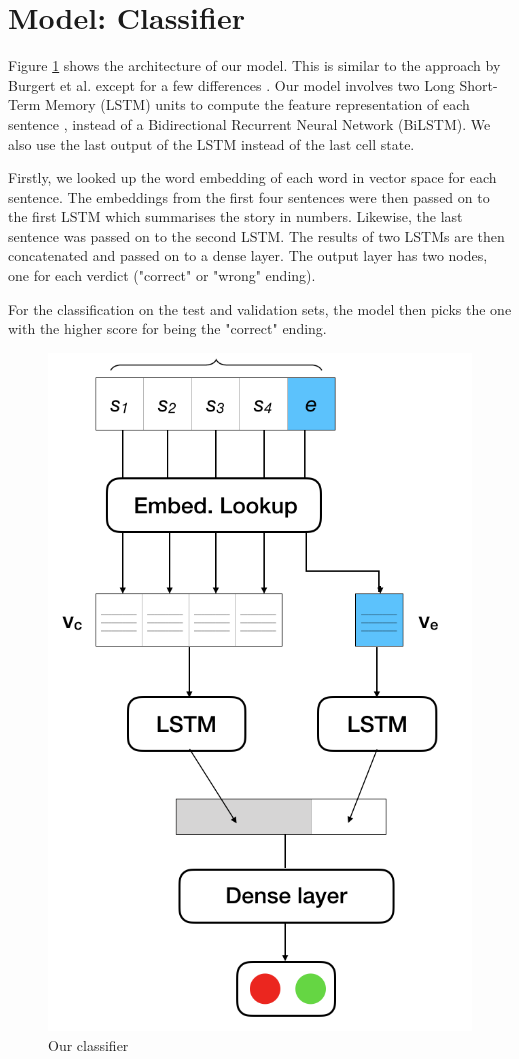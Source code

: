 \documentclass{article}
\begin{document}
\section{Model: Classifier}

Figure \ref{Figure:model} shows the architecture of our model. This is similar to the approach by Burgert et al. except for a few differences \cite{top4}. Our model involves two Long Short-Term Memory (LSTM) units to compute the feature representation of each sentence \citep{lstm}, instead of a Bidirectional Recurrent Neural Network (BiLSTM). We also use the last output of the LSTM instead of the last cell state.

Firstly, we looked up the word embedding of each word in vector space for each sentence. The embeddings from the first four sentences were then passed on to the first LSTM which summarises the story in numbers. Likewise, the last sentence was passed on to the second LSTM. The results of two LSTMs are then concatenated and passed on to a dense layer. The output layer has two nodes, one for each verdict ("correct" or "wrong" ending).

For the classification on the test and validation sets, the model then picks the one with the higher score for being the "correct" ending.

\begin{figure}
  \centering
  \includegraphics[width=0.5 \linewidth]{fig/ourmodel.PNG}
  \caption{Our classifier}
  \label{Figure:model}
\end{figure}
\end{document}

